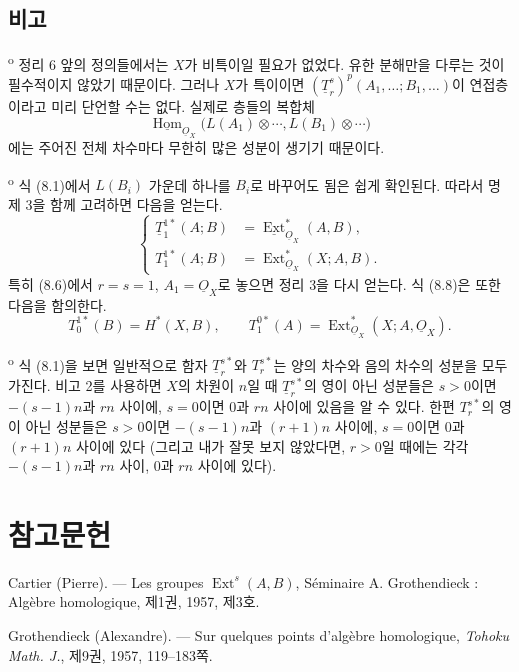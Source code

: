 \documentclass[11pt,twoside,openany]{book}
\numberwithin{equation}{section}
\newcommand{\sourceunit}{front}
\newcommand{\src}[1]{%
  \phantomsection\hypertarget{src:\sourceunit:#1}{}%
  \marginpar{\raggedleft\footnotesize\sffamily #1}%
}
\newcommand{\Osh}{\underline{O}}
\newcommand{\Homsh}{\underline{\operatorname{Hom}}}
\newcommand{\Extsh}{\underline{\operatorname{Ext}}}
\theoremstyle{plain}
\theoremstyle{definition}
\theoremstyle{remark}
\begin{document}
\src{192}
\subsection*{비고}

\textsuperscript{o} 정리 6 앞의 정의들에서는 $X$가
비특이일 필요가 없었다. 유한 분해만을 다루는 것이 필수적이지 않았기
때문이다. 그러나 $X$가 특이이면
$(\underline{T}_{r}^{s})^{p}(A_1,\ldots;B_1,\ldots)$이 연접층이라고
미리 단언할 수는 없다. 실제로 층들의 복합체
\[
  \Homsh_{\Osh_X}\bigl(L(A_1)\otimes\cdots,L(B_1)\otimes\cdots\bigr)
\]
에는 주어진 전체 차수마다 무한히 많은 성분이 생기기 때문이다.

\medskip
{}\textsuperscript{o} 식 (8.1)에서 $L(B_i)$ 가운데 하나를
$B_i$로 바꾸어도 됨은 쉽게 확인된다. 따라서 명제 3을 함께 고려하면
다음을 얻는다.
\begin{equation}\tag{8.8}
\left\{
\begin{aligned}
  \underline{T}_{1}^{1*}(A;B)&=\Extsh_{\Osh_X}^{*}(A,B),\\
  T_{1}^{1*}(A;B)&=\operatorname{Ext}_{\Osh_X}^{*}(X;A,B).
\end{aligned}
\right.
\end{equation}
특히 (8.6)에서 $r=s=1$, $A_1=\Osh_X$로 놓으면 정리 3을 다시 얻는다.
식 (8.8)은 또한 다음을 함의한다.
\[
  T_{0}^{1*}(B)=H^{*}(X,B),
  \qquad
  T_{1}^{0*}(A)=\operatorname{Ext}_{\Osh_X}^{*}(X;A,\Osh_X).
\]

\medskip
{}\textsuperscript{o} 식 (8.1)을 보면 일반적으로 함자
$\underline{T}_{r}^{s*}$와 $T_{r}^{s*}$는 양의 차수와 음의 차수의
성분을 모두 가진다. 비고 2를 사용하면 $X$의 차원이 $n$일 때
$\underline{T}_{r}^{s*}$의 영이 아닌 성분들은 $s>0$이면
$-(s-1)n$과 $rn$ 사이에, $s=0$이면 $0$과 $rn$ 사이에 있음을 알 수
있다. 한편 $T_{r}^{s*}$의 영이 아닌 성분들은 $s>0$이면
$-(s-1)n$과 $(r+1)n$ 사이에, $s=0$이면 $0$과 $(r+1)n$ 사이에 있다
(그리고 내가 잘못 보지 않았다면, $r>0$일 때에는 각각
$-(s-1)n$과 $rn$ 사이, $0$과 $rn$ 사이에 있다).

\section*{참고문헌}

\noindent[1] Cartier (Pierre). --- Les groupes
$\operatorname{Ext}^{s}(A,B)$, Séminaire A. Grothendieck : Algèbre homologique,
제1권, 1957, 제3호.

\noindent[2] Grothendieck (Alexandre). --- Sur quelques points d'algèbre
homologique, \emph{Tohoku Math. J.}, 제9권, 1957, 119--183쪽.
\end{document}
